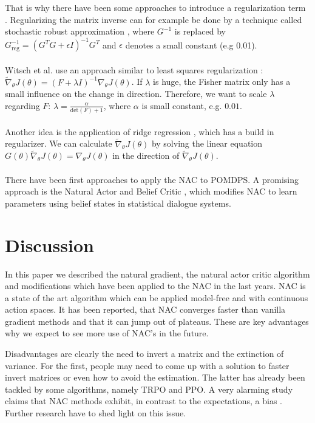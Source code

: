 	That is why there have been some approaches to introduce a regularization term \cite{sohl2012natural}. Regularizing the matrix inverse can for example be done by a technique called stochastic robust approximation \cite{boyd2004convex}, where $G^{-1}$ is replaced by \(G^{-1}_{\text{reg}} = \left( G^T G + \epsilon I \right)^{-1} G^T\) and $\epsilon$ denotes a small constant (e.g 0.01).
	\\\\
	Witsch et al. use an approach similar to least squares regularization \cite{witsch2011enhancing}: \( \widetilde{ \nabla }_{\theta} J(\theta) = \left( F + \lambda I \right)^{-1} \nabla_\theta J(\theta)\). If $\lambda$ is huge, the Fisher matrix only has a small influence on the change in direction. Therefore, we want to scale $\lambda$ regarding $F$: \(\lambda = \tfrac{\alpha}{\text{det}(F) + 1}\), where $\alpha$ is small constant, e.g. $0.01$.
	\\\\
	Another idea is the application of ridge regression \cite{hoerl1970ridge}, which has a build in regularizer. We can calculate $\widetilde{\nabla}_{\theta} J(\theta)$ by solving the linear equation \(G(\theta) \widetilde{\nabla}_{\theta} J(\theta) = \nabla_{\theta} J(\theta)\) in the direction of $\widetilde{\nabla}_{\theta} J(\theta)$.
	\\\\
	 There have been first approaches to apply the NAC to POMDPS. A promising approach is the Natural Actor and Belief Critic \cite{jurvcivcek2011natural}, which modifies NAC to learn parameters using belief states in statistical dialogue systems.


\section{Discussion}
\label{sec:discussion}

In this paper we described the natural gradient, the natural actor critic algorithm and modifications which have been applied to the NAC in the last years. NAC is a state of the art algorithm which can be applied model-free and with continuous action spaces. It has been reported, that NAC converges faster than vanilla gradient methods and that it can jump out of plateaus. These are key advantages why we expect to see more use of NAC's in the future. 

Disadvantages are clearly the need to invert a matrix and the extinction of variance. For the first, people may need to come up with a solution to faster invert matrices or even how to avoid the estimation. The latter has already been tackled by some algorithms, namely TRPO and PPO. A very alarming study claims that NAC methods exhibit, in contrast to the expectations, a bias \cite{thomas2014bias}. Further research have to shed light on this issue.

